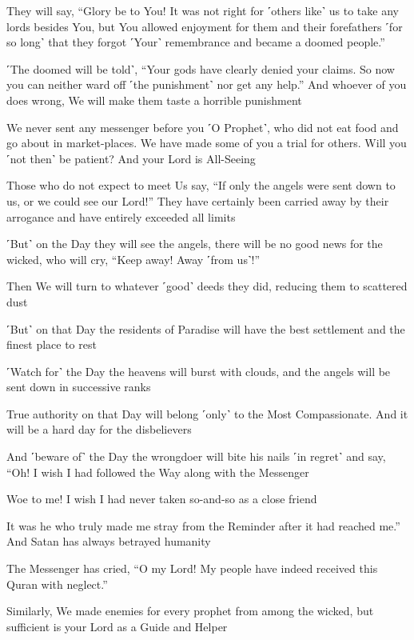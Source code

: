 They will say, “Glory be to You! It was not right for ˹others like˺ us to take any lords besides You, but You allowed enjoyment for them and their forefathers ˹for so long˺ that they forgot ˹Your˺ remembrance and became a doomed people.”

˹The doomed will be told˺, “Your gods have clearly denied your claims. So now you can neither ward off ˹the punishment˺ nor get any help.” And whoever of you does wrong, We will make them taste a horrible punishment

We never sent any messenger before you ˹O Prophet˺, who did not eat food and go about in market-places. We have made some of you a trial for others. Will you ˹not then˺ be patient? And your Lord is All-Seeing

Those who do not expect to meet Us say, “If only the angels were sent down to us, or we could see our Lord!” They have certainly been carried away by their arrogance and have entirely exceeded all limits

˹But˺ on the Day they will see the angels, there will be no good news for the wicked, who will cry, “Keep away! Away ˹from us˺!”

Then We will turn to whatever ˹good˺ deeds they did, reducing them to scattered dust

˹But˺ on that Day the residents of Paradise will have the best settlement and the finest place to rest

˹Watch for˺ the Day the heavens will burst with clouds, and the angels will be sent down in successive ranks

True authority on that Day will belong ˹only˺ to the Most Compassionate. And it will be a hard day for the disbelievers

And ˹beware of˺ the Day the wrongdoer will bite his nails ˹in regret˺ and say, “Oh! I wish I had followed the Way along with the Messenger

Woe to me! I wish I had never taken so-and-so as a close friend

It was he who truly made me stray from the Reminder after it had reached me.” And Satan has always betrayed humanity

The Messenger has cried, “O my Lord! My people have indeed received this Quran with neglect.”

Similarly, We made enemies for every prophet from among the wicked, but sufficient is your Lord as a Guide and Helper

